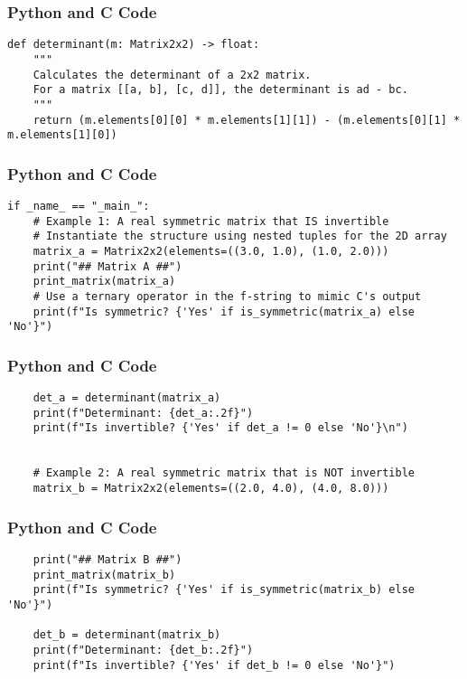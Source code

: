 \documentclass{beamer}
\begin{document}
\begin{frame}[fragile]
\frametitle{Python and C Code}
\begin{lstlisting}
def determinant(m: Matrix2x2) -> float:
    """
    Calculates the determinant of a 2x2 matrix.
    For a matrix [[a, b], [c, d]], the determinant is ad - bc.
    """
    return (m.elements[0][0] * m.elements[1][1]) - (m.elements[0][1] * m.elements[1][0])
\end{lstlisting}
\end{frame}

\begin{frame}[fragile]
\frametitle{Python and C Code}
\begin{lstlisting}
if _name_ == "_main_":
    # Example 1: A real symmetric matrix that IS invertible
    # Instantiate the structure using nested tuples for the 2D array
    matrix_a = Matrix2x2(elements=((3.0, 1.0), (1.0, 2.0)))
    print("## Matrix A ##")
    print_matrix(matrix_a)
    # Use a ternary operator in the f-string to mimic C's output
    print(f"Is symmetric? {'Yes' if is_symmetric(matrix_a) else 'No'}")
\end{lstlisting}
\end{frame}

\begin{frame}[fragile]
\frametitle{Python and C Code}
\begin{lstlisting}
    det_a = determinant(matrix_a)
    print(f"Determinant: {det_a:.2f}")
    print(f"Is invertible? {'Yes' if det_a != 0 else 'No'}\n")


    # Example 2: A real symmetric matrix that is NOT invertible
    matrix_b = Matrix2x2(elements=((2.0, 4.0), (4.0, 8.0)))
\end{lstlisting}
\end{frame}

\begin{frame}[fragile]
\frametitle{Python and C Code}
\begin{lstlisting}
    print("## Matrix B ##")
    print_matrix(matrix_b)
    print(f"Is symmetric? {'Yes' if is_symmetric(matrix_b) else 'No'}")

    det_b = determinant(matrix_b)
    print(f"Determinant: {det_b:.2f}")
    print(f"Is invertible? {'Yes' if det_b != 0 else 'No'}")
\end{lstlisting}
\end{frame}
\end{document}
